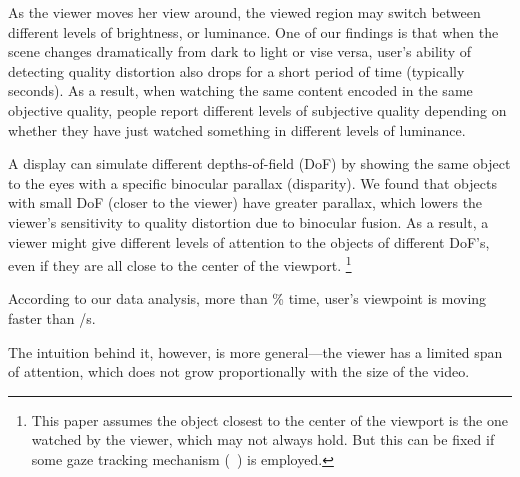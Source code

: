 As the viewer moves her view around, the viewed region may switch between different levels of brightness, or luminance. 
One of our findings is that when the scene changes dramatically from dark to light or vise versa, user's ability of detecting quality distortion also drops for a short period of time (typically \fillme seconds).
As a result, when watching the same content encoded in the same objective quality, people report different levels of subjective quality depending on whether they have just watched something in different levels of luminance.


A \vr display can simulate different depths-of-field (DoF) by showing the same object to the eyes with a specific binocular parallax (disparity). 
We found that objects with small DoF (\ie closer to the viewer) have greater parallax, which lowers the viewer's sensitivity to quality distortion due to binocular fusion.
As a result, a viewer might give different levels of attention to the objects of different DoF's, even if they are all close to the center of the viewport. \footnote{This paper assumes the object closest to the center of the viewport is the one watched by the viewer, which may not always hold. But this can be fixed if some gaze tracking mechanism (\eg~\cite{??,??}) is employed.}




According to our data analysis, more than \fillme\% time, user's viewpoint is moving faster than \fillme \textdegree/s. 




The intuition behind it, however, is more general---the viewer has a limited span of attention, which does not grow proportionally with the size of the video. 

